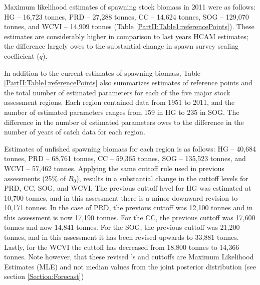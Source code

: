 Maximum likelihood estimates of spawning stock biomass in 2011 were as follows: HG -- 16,723 tonnes, PRD -- 27,288 tonnes, CC -- 14,624 tonnes, SOG -- 129,070 tonnes, and WCVI -- 14,909 tonnes (Table \ref{PartII:Table1:referencePoints}).  These estimates are considerably higher in comparison to last years HCAM estimates; the difference largely owes to the substantial change in spawn survey scaling coefficient ($q$).

In addition to the current estimates of spawning biomass, Table \ref{PartII:Table1:referencePoints} also summarizes estimates of reference points and the total number of estimated parameters for each of the five major stock assessment regions.  Each region contained data from 1951 to 2011, and the number of estimated parameters ranges from 159 in HG to 235 in SOG.  The difference in the number of estimated parameters owes to the difference in the number of years of catch data for each region.

Estimates of unfished spawning biomass for each region is as follows: HG -- 40,684 tonnes, PRD -- 68,761 tonnes, CC -- 59,365 tonnes, SOG -- 135,523 tonnes, and WCVI -- 57,462 tonnes.  Applying the same cuttoff rule used in previous assessments (25\% of $B_0$), results in a substantial change in the cuttoff levels for PRD, CC, SOG, and WCVI.  The previous cuttoff level for HG was estimated at 10,700 tonnes, and in this assessment there is a minor downward revision to 10,171 tonnes.  In the case of PRD, the previous cuttoff was 12,100 tonnes and in this assessment is now 17,190 tonnes.  For the CC, the previous cuttoff was 17,600 tonnes and now 14,841 tonnes.  For the SOG, the previous cuttoff was 21,200 tonnes, and in this assessment it has been revised upwards to 33,881 tonnes.  Lastly, for the WCVI the cuttoff has decreased from 18,800 tonnes to 14,366 tonnes. Note however, that these revised \bo's and cuttoffs are Maximum Likelihood Estimates (MLE) and not median values from the joint posterior distribution (see section \ref{Section:Forecast})





